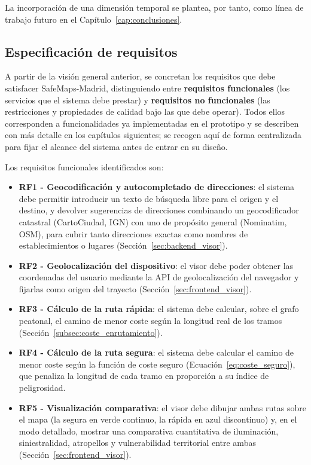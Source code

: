 La incorporación de una dimensión temporal se plantea, por tanto, como línea de trabajo futuro en el Capítulo~\ref{cap:conclusiones}.

\subsection{Especificación de requisitos}
\label{subsec:requisitos}

A partir de la visión general anterior, se concretan los requisitos que debe satisfacer SafeMaps-Madrid, distinguiendo entre \textbf{requisitos funcionales} (los servicios que el sistema debe prestar) y \textbf{requisitos no funcionales} (las restricciones y propiedades de calidad bajo las que debe operar). Todos ellos corresponden a funcionalidades ya implementadas en el prototipo y se describen con más detalle en los capítulos siguientes; se recogen aquí de forma centralizada para fijar el alcance del sistema antes de entrar en su diseño.

Los requisitos funcionales identificados son:

\begin{itemize}
    \item \textbf{RF1 - Geocodificación y autocompletado de direcciones}: el sistema debe permitir introducir un texto de búsqueda libre para el origen y el destino, y devolver sugerencias de direcciones combinando un geocodificador catastral (CartoCiudad, IGN) con uno de propósito general (Nominatim, OSM), para cubrir tanto direcciones exactas como nombres de establecimientos o lugares (Sección~\ref{sec:backend_visor}).
    \item \textbf{RF2 - Geolocalización del dispositivo}: el visor debe poder obtener las coordenadas del usuario mediante la API de geolocalización del navegador y fijarlas como origen del trayecto (Sección~\ref{sec:frontend_visor}).
    \item \textbf{RF3 - Cálculo de la ruta rápida}: el sistema debe calcular, sobre el grafo peatonal, el camino de menor coste según la longitud real de los tramos (Sección~\ref{subsec:coste_enrutamiento}).
    \item \textbf{RF4 - Cálculo de la ruta segura}: el sistema debe calcular el camino de menor coste según la función de coste seguro (Ecuación~\ref{eq:coste_seguro}), que penaliza la longitud de cada tramo en proporción a su índice de peligrosidad.
    \item \textbf{RF5 - Visualización comparativa}: el visor debe dibujar ambas rutas sobre el mapa (la segura en verde continuo, la rápida en azul discontinuo) y, en el modo detallado, mostrar una comparativa cuantitativa de iluminación, siniestralidad, atropellos y vulnerabilidad territorial entre ambas (Sección~\ref{sec:frontend_visor}).
\end{itemize}

